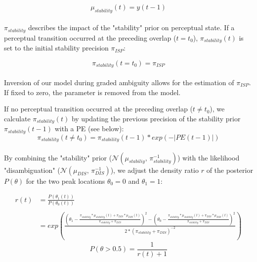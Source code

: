 \documentclass[12pt]{article}
\begin{document}
\begin{equation}
 \mu_{stability}(t) = y(t-1)
\end{equation} \\ 

$\pi_{stability}$ describes the impact of the "stability" prior on perceptual state. If a perceptual transition occurred at the preceding overlap ($t=t_0$), $\pi_{stability}(t)$ is set to the initial stability precision $\pi_{ISP}$:

\begin{equation}
 \pi_{stability}(t = t_0) = \pi_{ISP}
\end{equation} \\

Inversion of our model during graded ambiguity allows for the estimation of $\pi_{ISP}$. If fixed to zero, the parameter is removed from the model. 

If no perceptual transition occurred at the preceding overlap ($t \neq t_0$), we calculate $\pi_{stability}(t)$ by updating the previous precision of the stability prior $\pi_{stability}(t-1)$ with a PE (see below):
\begin{equation}
 \pi_{stability}(t \neq t_0) = \pi_{stability}(t-1)*exp(-|PE(t-1)|)
\end{equation} \\

By combining the "stability" prior ($\mathcal{N}(\mu_{stabiliy},\,\pi_{stability}^{-1})$) with the likelihood "disambiguation" ($\mathcal{N}(\mu_{DIS},\,\pi_{DIS}^{-1})$), we adjust the density ratio $r$ of the posterior $P(\theta)$ for the two peak locations $\theta_0 = 0$ and $\theta_1 = 1$:

\begin{equation}
\begin{split}
r(t) &=\frac{P(\theta_1(t))}{P(\theta_0(t))} \\
     & \\
     &=exp(\frac{(\theta_1- \frac{\pi_{stability} * \mu_{stability}(t) + \pi_{DIS} * \mu_{DIS}(t)}{\pi_{stability} + \pi_{DIS}})^{2}-(\theta_0-\frac{\pi_{stability}*\mu_{stability}(t) + \pi_{DIS}*\mu_{DIS}(t)}{\pi_{stability} + \pi_{DIS}})^{2}}{2 * (\pi_{stability}+\pi_{DIS})^{-2}})
\end{split}
\end{equation}
\begin{equation}
P(\theta > 0.5)=\frac{1}{r(t)+1}
\end{equation} \\
\end{document}
